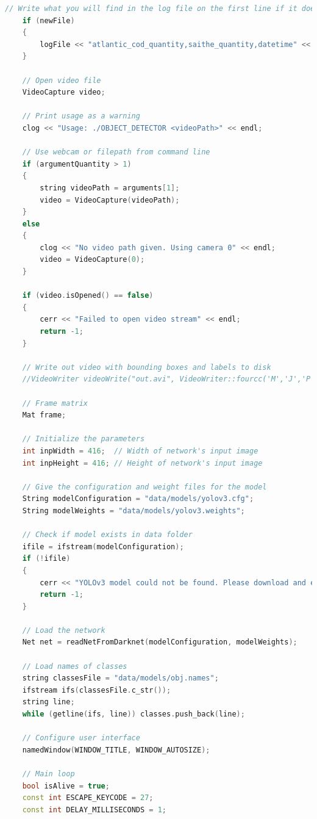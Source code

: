\begin{lstlisting}[language=C++, caption=main.cpp]
    // Write what you will find in the log file on the first line if it does not already exist
    if (newFile)
    {
        logFile << "atlantic_cod_quantity,saithe_quantity,datetime" << endl;
    }

    // Open video file
    VideoCapture video;

    // Print usage as a warning
    clog << "Usage: ./OBJECT_DETECTOR <videoPath>" << endl;

    // Use webcam or filepath from command line
    if (argumentQuantity > 1)
    {
        string videoPath = arguments[1];
        video = VideoCapture(videoPath);
    }
    else
    {
        clog << "No video path given. Using camera 0" << endl;
        video = VideoCapture(0);
    }

    if (video.isOpened() == false)
    {
        cerr << "Failed to open video stream" << endl;
        return -1;
    }

    // Write out video with bounding boxes and labels to disk
    //VideoWriter videoWrite("out.avi", VideoWriter::fourcc('M','J','P','G'), 10, Size(width, height));

    // Frame matrix
    Mat frame;

    // Initialize the parameters
    int inpWidth = 416;  // Width of network's input image
    int inpHeight = 416; // Height of network's input image

    // Give the configuration and weight files for the model
    String modelConfiguration = "data/models/yolov3.cfg";
    String modelWeights = "data/models/yolov3.weights";

    // Check if model exists in data folder
    ifile = ifstream(modelConfiguration);
    if (!ifile)
    {
        cerr << "YOLOv3 model could not be found. Please download and extract data from here: https://www.dropbox.com/s/aym2lmnzjlam16v/data.zip" << endl;
        return -1;
    }

    // Load the network
    Net net = readNetFromDarknet(modelConfiguration, modelWeights);

    // Load names of classes
    string classesFile = "data/models/obj.names";
    ifstream ifs(classesFile.c_str());
    string line;
    while (getline(ifs, line)) classes.push_back(line);

    // Configure user interface
    namedWindow(WINDOW_TITLE, WINDOW_AUTOSIZE);

    // Main loop
    bool isAlive = true;
    const int ESCAPE_KEYCODE = 27;
    const int DELAY_MILLISECONDS = 1;


\end{lstlisting}
